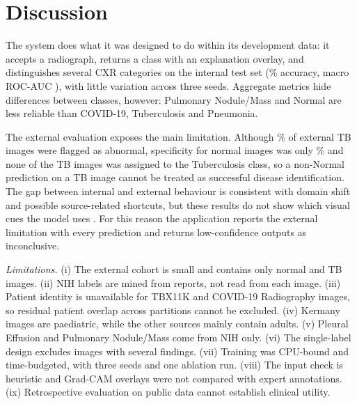 \section{Discussion}\label{sec:discussion}
The system does what it was designed to do within its development data: it accepts a radiograph,
returns a class with an explanation overlay, and distinguishes several CXR categories on the internal
test set (\RTestAcc\% accuracy, macro ROC-AUC \RTestMacroAUC), with little variation across three seeds.
Aggregate metrics hide differences between classes, however: Pulmonary Nodule/Mass and Normal are less
reliable than COVID-19, Tuberculosis and Pneumonia.

The external evaluation exposes the main limitation. Although \RExtSens\% of external TB images were
flagged as abnormal, specificity for normal images was only \RExtSpec\% and none of the TB images was
assigned to the Tuberculosis class, so a non-Normal prediction on a TB image cannot be treated as
successful disease identification. The gap between internal and external behaviour is consistent with
domain shift and possible source-related shortcuts, but these results do not show which visual cues the
model uses \cite{zech2018variable,degrave2021ai,geirhos2020shortcut}. For this reason the application
reports the external limitation with every prediction and returns low-confidence outputs as
inconclusive.

\emph{Limitations.}
(i) The external cohort is small and contains only normal and TB images.
(ii) NIH labels are mined from reports, not read from each image.
(iii) Patient identity is unavailable for TBX11K and COVID-19 Radiography images, so residual patient
overlap across partitions cannot be excluded.
(iv) Kermany images are paediatric, while the other sources mainly contain adults.
(v) Pleural Effusion and Pulmonary Nodule/Mass come from NIH only.
(vi) The single-label design excludes images with several findings.
(vii) Training was CPU-bound and time-budgeted, with three seeds and one ablation run.
(viii) The input check is heuristic and Grad-CAM overlays were not compared with expert annotations.
(ix) Retrospective evaluation on public data cannot establish clinical utility.

